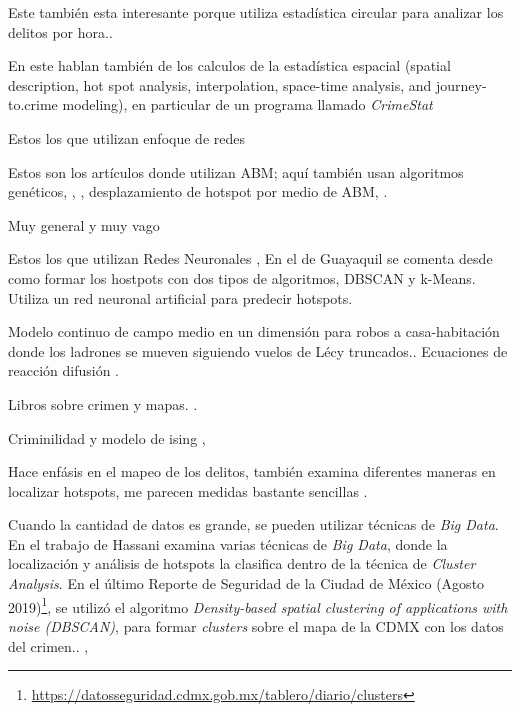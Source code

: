 \documentclass[onecolumn,12pt,letterpaper]{article}
\begin{document}
Este también esta interesante porque utiliza estadística circular para analizar los delitos por hora.\cite{brunsdon2006using}.


En este hablan también de los calculos de la estadística espacial (spatial description, hot spot analysis, interpolation, space-time analysis, and journey-to.crime modeling), en particular de un programa llamado \textit{CrimeStat}\cite{levine2006crime}

Estos los que utilizan enfoque de redes

Estos son los artículos donde utilizan ABM; aquí también usan algoritmos genéticos\cite{furtado_bio-inspired_2009}, \cite{malleson_agent-based_2009}, \cite{malleson_crime_2010} , desplazamiento de hotspot por medio de ABM\cite{wang_analyzing_2014}, \cite{devia_generating_2013}. \cite{hegemann_geographical_2011}

Muy general y muy vago \cite{butorac_geography_2017}

Estos los que utilizan Redes Neuronales \cite{francisco_alisis_2015}, \cite{olligschlaeger_artificial_1998}
En el de Guayaquil se comenta desde como formar los hostpots con dos tipos de algoritmos, DBSCAN y k-Means. Utiliza un red neuronal artificial para predecir hotspots.\cite{garcia-plua_deteccion_2017} \cite{zhuang_crime_2017}

Modelo continuo de campo medio en un dimensión para robos a casa-habitación donde los ladrones se mueven siguiendo vuelos de Lécy truncados.\cite{pan_crime_2018}. Ecuaciones de reacción difusión \cite{short_dissipation_2010}.


Libros sobre crimen y mapas. \cite{rossmo_geographic_2014} \cite{santos_crime_2016} \cite{liu_artificial_2008} \cite{weisburd_crime_1998} \cite{chainey_crime_2008}. 


Criminilidad y modelo de ising \cite{ayouche_second_2015}, 



Hace enfásis en el mapeo de los delitos, también examina diferentes maneras en localizar hotspots, me parecen medidas bastante sencillas \cite{ratcliffe_crime_2010}. 


Cuando la cantidad de datos es grande, se pueden utilizar técnicas de \textit{Big Data}. En el trabajo de Hassani\cite{hassani_review_2016} examina varias técnicas de \textit{Big Data}, donde  la localización y análisis de hotspots la clasifica dentro de la técnica de \textit{Cluster Analysis}. En el último Reporte de Seguridad de la Ciudad de México (Agosto 2019)\footnote{\url{https://datosseguridad.cdmx.gob.mx/tablero/diario/clusters}}, se utilizó el algoritmo \textit{Density-based spatial clustering of applications with noise (DBSCAN)}, para formar \textit{clusters} sobre el mapa de la CDMX con los datos del crimen.\cite{noauthor_datos_nodate}.  \cite{noauthor_big_nodate} \cite{chen_crime_2004},
\end{document}
